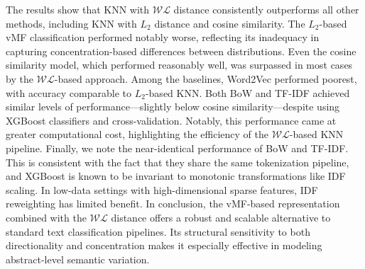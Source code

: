 \documentclass[10pt]{article}
\newcommand{\WL}{\mathcal{WL}}
\begin{document}
The results show that KNN with $\WL$ distance consistently outperforms all other methods, including KNN with $L_2$ distance and cosine similarity. The $L_2$-based vMF classification performed notably worse, reflecting its inadequacy in capturing concentration-based differences between distributions. Even the cosine similarity model, which performed reasonably well, was surpassed in most cases by the $\WL$-based approach. Among the baselines, Word2Vec performed poorest, with accuracy comparable to $L_2$-based KNN. Both BoW and TF-IDF achieved similar levels of performance—slightly below cosine similarity—despite using XGBoost classifiers and cross-validation. Notably, this performance came at greater computational cost, highlighting the efficiency of the $\WL$-based KNN pipeline. Finally, we note the near-identical performance of BoW and TF-IDF. This is consistent with the fact that they share the same tokenization pipeline, and XGBoost is known to be invariant to monotonic transformations like IDF scaling. In low-data settings with high-dimensional sparse features, IDF reweighting has limited benefit. In conclusion, the vMF-based representation combined with the $\WL$ distance offers a robust and scalable alternative to standard text classification pipelines. Its structural sensitivity to both directionality and concentration makes it especially effective in modeling abstract-level semantic variation.
\end{document}
